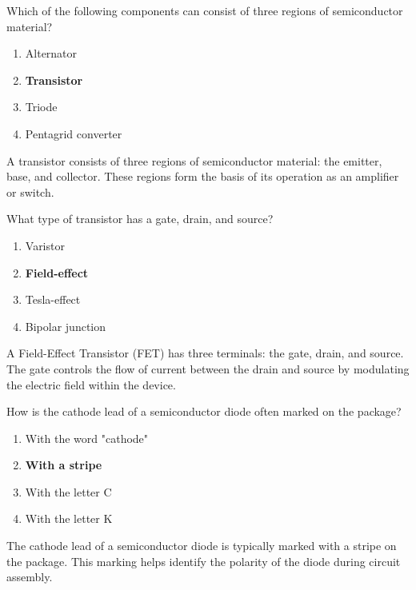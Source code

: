 \begin{tcolorbox}[colback=gray!10!white,colframe=black!75!black,title={T6B04}]
    Which of the following components can consist of three regions of semiconductor material?
    \begin{enumerate}[label=\Alph*),noitemsep]
        \item Alternator
        \item \textbf{Transistor}
        \item Triode
        \item Pentagrid converter
    \end{enumerate}
\end{tcolorbox}
A transistor consists of three regions of semiconductor material: the emitter, base, and collector. These regions form the basis of its operation as an amplifier or switch. %

\begin{tcolorbox}[colback=gray!10!white,colframe=black!75!black,title={T6B05}]
    What type of transistor has a gate, drain, and source?
    \begin{enumerate}[label=\Alph*),noitemsep]
        \item Varistor
        \item \textbf{Field-effect}
        \item Tesla-effect
        \item Bipolar junction
    \end{enumerate}
\end{tcolorbox}
A Field-Effect Transistor (FET) has three terminals: the gate, drain, and source. The gate controls the flow of current between the drain and source by modulating the electric field within the device. %

\begin{tcolorbox}[colback=gray!10!white,colframe=black!75!black,title={T6B06}]
    How is the cathode lead of a semiconductor diode often marked on the package?
    \begin{enumerate}[label=\Alph*),noitemsep]
        \item With the word "cathode"
        \item \textbf{With a stripe}
        \item With the letter C
        \item With the letter K
    \end{enumerate}
\end{tcolorbox}
The cathode lead of a semiconductor diode is typically marked with a stripe on the package. This marking helps identify the polarity of the diode during circuit assembly. %

